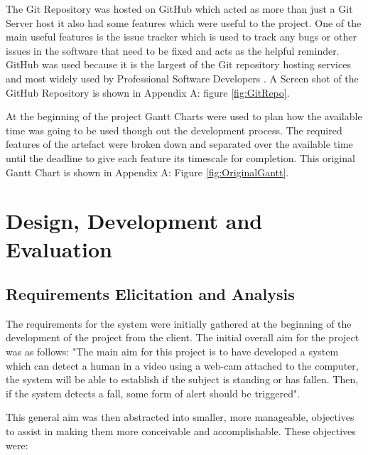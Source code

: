 \documentclass[11pt,a4paper]{report}
\begin{document}
The Git Repository was hosted on GitHub which acted as more than just a Git Server host \citep{GitHub} it also had some features which were useful to the project. One of the main useful features is the issue tracker which is used to track any bugs or other issues in the software that need to be fixed and acts as the helpful reminder. GitHub was used because it is the largest of the Git repository hosting services and most widely used by Professional Software Developers \citep{GitHubMarketShare}. A Screen shot of the GitHub Repository is shown in Appendix A: figure \ref{fig:GitRepo}.

At the beginning of the project Gantt Charts were used to plan how the available time was going to be used though out the development process. The required features of the artefact were broken down and separated over the available time until the deadline to give each feature its timescale for completion. This original Gantt Chart is shown in Appendix A: Figure \ref{fig:OriginalGantt}. 

\chapter{Design, Development and Evaluation}

\section{Requirements Elicitation and Analysis}

The requirements for the system were initially gathered at the beginning of the development of the project from the client. The initial overall aim for the project was as follows: "The main aim for this project is to have developed a system which can detect a human in a video using a web-cam attached to the computer, the system will be able to establish if the subject is standing or has fallen. Then, if the system detects a fall, some form of alert should be triggered".

This general aim was then abstracted into smaller, more manageable, objectives to assist in making them more conceivable and accomplishable. These objectives were:
\end{document}
